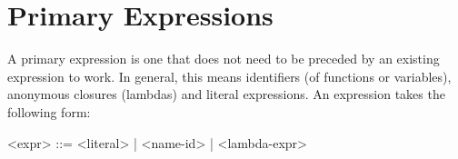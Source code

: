 \section{Primary Expressions}

A primary expression is one that does not need to be preceded by an existing expression to work. In general, this means identifiers (of functions or variables), anonymous closures (lambdas) and literal expressions. An expression takes the following form:

\begin{grammar}
	<expr> ::= <literal> | <name-id> | <lambda-expr>
\end{grammar} 




